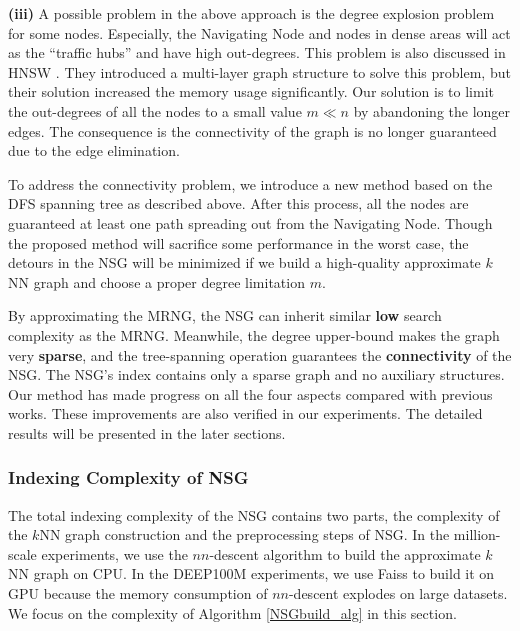 \documentclass{vldb}
\begin{document}




\textbf{(iii)} A possible problem in the above approach is the degree explosion problem for some nodes. Especially, the Navigating Node and nodes in dense areas will act as the ``traffic hubs'' and have high out-degrees. This problem is also discussed in HNSW \cite{MalkovYHNSW16}. They introduced a multi-layer graph structure to solve this problem, but their solution increased the memory usage significantly. Our solution is to limit the out-degrees of all the nodes to a small value $m \ll n$ by abandoning the longer edges. The consequence is the connectivity of the graph is no longer guaranteed due to the edge elimination. 

To address the connectivity problem, we introduce a new method based on the DFS spanning tree as described above. After this process, all the nodes are guaranteed at least one path spreading out from the Navigating Node. Though the proposed method will sacrifice some performance in the worst case, the detours in the NSG will be minimized if we build a high-quality approximate $k$NN graph and choose a proper degree limitation $m$. 

By approximating the MRNG, the NSG can inherit similar \textbf{low} search complexity as the MRNG. Meanwhile, the degree upper-bound makes the graph very \textbf{sparse}, and the tree-spanning operation guarantees the \textbf{connectivity} of the NSG.  The NSG's index contains only a sparse graph and no auxiliary structures. Our method has made progress on all the four aspects compared with previous works. These improvements are also verified in our experiments. The detailed results will be presented in the later sections. 

\subsubsection{Indexing Complexity of NSG}
The total indexing complexity of the NSG contains two parts, the complexity of the $k$NN graph construction and the preprocessing steps of NSG. In the million-scale experiments, we use the $nn$-descent algorithm \cite{Dong2011Efficient} to build the approximate $k$NN graph on CPU. In the DEEP100M experiments, we use Faiss \cite{johnson2017billion} to build it on GPU because the memory consumption of $nn$-descent explodes on large datasets. We focus on the complexity of Algorithm \ref{NSGbuild_alg} in this section.
\end{document}
